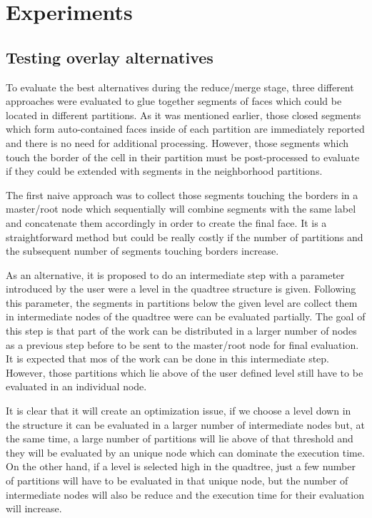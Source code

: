 \section{Experiments}

\subsection{Testing overlay alternatives}
To evaluate the best alternatives during the reduce/merge stage, three different approaches were evaluated to glue together segments of faces which could be located in different partitions.  As it was mentioned earlier, those closed segments which form auto-contained faces inside of each partition are immediately reported and there is no need for additional processing.  However, those segments which touch the border of the cell in their partition must be post-processed to evaluate if they could be extended with segments in the neighborhood partitions.

The first naive approach was to collect those segments touching the borders in a master/root node which sequentially will combine segments with the same label and concatenate them accordingly in order to create the final face.  It is a straightforward method but could be really costly if the number of partitions and the subsequent number of segments touching borders increase.

As an alternative, it is proposed to do an intermediate step with a parameter introduced by the user were a level in the quadtree structure is given.  Following this parameter, the segments in partitions below the given level are collect them in intermediate nodes of the quadtree were can be evaluated partially.  The goal of this step is that part of the work can be distributed in a larger number of nodes as a previous step before to be sent to the master/root node for final evaluation.  It is expected that mos of the work can be done in this intermediate step.  However, those partitions which lie above of the user defined level still have to be evaluated in an individual node.

It is clear that it will create an optimization issue, if we choose a level down in the structure it can be evaluated in a larger number of intermediate nodes but, at the same time, a large number of partitions will lie above of that threshold and they will be evaluated by an unique node which can dominate the execution time.  On the other hand, if a level is selected high in the quadtree, just a few number of partitions will have to be evaluated in that unique node, but the number of intermediate nodes will also be reduce and the execution time for their evaluation will increase.

